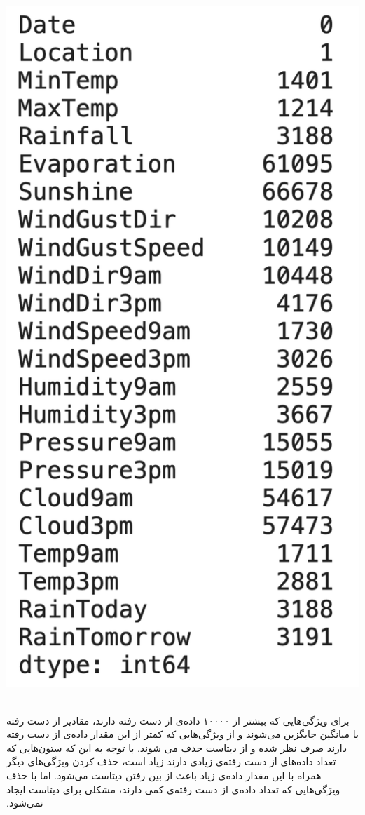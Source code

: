 ‫\begin{center}
‫\includegraphics[scale=0.35]{figs/nan.png}
‫\end{center}
‫
‫برای ویژگی‌هایی که بیشتر از ۱۰۰۰۰ داده‌ی از دست رفته دارند، مقادیر از دست رفته با میانگین جایگزین می‌شوند و از ویژگی‌هایی که کمتر از این مقدار داده‌ی از دست رفته دارند صرف نظر شده و از دیتاست حذف می ‌شوند. با توجه به این که ستون‌هایی که تعداد داده‌های از دست رفته‌ی زیادی دارند زیاد است، حذف کردن ویژگی‌های دیگر همراه با این مقدار داده‌ی زیاد باعث از بین رفتن دیتاست می‌شود. اما با حذف ویژگی‌هایی که تعداد داده‌ی از دست رفته‌ی کمی دارند، مشکلی برای دیتاست ایجاد نمی‌شود. \newline
